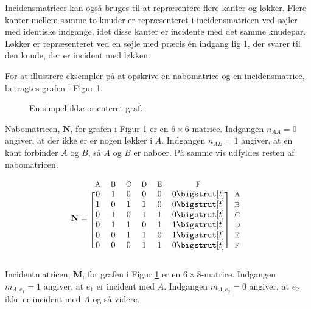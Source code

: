 Incidensmatricer kan også bruges til at repræsentere flere kanter og løkker.
Flere kanter mellem samme to knuder er repræsenteret i incidensmatricen ved søjler med identiske indgange, idet disse kanter er incidente med det samme knudepar.
Løkker er repræsenteret ved en søjle med præcis én indgang lig 1, der svarer til den knude, der er incident med løkken.

\begin{exmp}
	For at illustrere eksempler på at opskrive en nabomatrice og en incidensmatrice, betragtes grafen i Figur \ref{fig:simple_graph_labels}. 
	
	\begin{figure}[h!]
		\centering
		
		\caption{En simpel ikke-orienteret graf.} \label{fig:simple_graph_labels}
	\end{figure}
	
	Nabomatricen, $\mathbf{N}$, for grafen i Figur \ref{fig:simple_graph_labels} er en $6 \times 6$-matrice.
	Indgangen $n_{AA}=0$ angiver, at der ikke er er nogen løkker i $A$.
	Indgangen $n_{AB}=1$ angiver, at en kant forbinder $A$ og $B$, så $A$ og $B$ er naboer.
	På samme vis udfyldes resten af nabomatricen. 
	
	 \begin{equation*}
	  \mathbf{N}=
	  \begin{blockarray}{*{6}{c} l}
	    \begin{block}{*{6}{>{$\footnotesize}c<{$}} l}
	      A & B & C & D & E & F \\
	    \end{block}
	    \begin{block}{[*{6}{c}]>{$\footnotesize}l<{$}}
	      0 & 1 & 0 & 0 & 0 & 0 \bigstrut[t]& A \\
	      1 & 0 & 1 & 1 & 0 & 0 \bigstrut[t]&B \\
	      0 & 1 & 0 & 1 & 1 & 0 \bigstrut[t]&C \\
	      0 & 1 & 1 & 0 & 1 & 1 \bigstrut[t]& D \\
	      0 & 0 & 1 & 1 & 0 & 1 \bigstrut[t]& E \\
	      0 & 0 & 0 & 1 & 1 & 0 \bigstrut[t]& F \\
	    \end{block}
	  \end{blockarray}
	\end{equation*} 
	
	Incidentmatricen, $\mathbf{M}$, for grafen i Figur \ref{fig:simple_graph_labels} er en $6 \times 8$-matrice.
	Indgangen $m_{A,e_1}=1$ angiver, at $e_1$ er incident med $A$.
	Indgangen $m_{A,e_2}=0$ angiver, at $e_2$ ikke er incident med $A$ og så videre.
	

\end{exmp}
